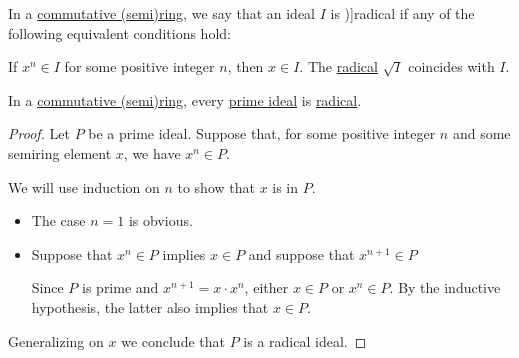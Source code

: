 \begin{definition}\label{def:radical_ideal}\cite[def. VII.2.13]{Aluffi2009}
  In a \hyperref[def:ring/commutative]{commutative (semi)ring}, we say that an ideal \( I \) is \term[ru=радикал (\cite[406]{Винберг2014})]{radical} if any of the following equivalent conditions hold:
  \begin{thmenum}
     If \( x^n \in I \) for some positive integer \( n \), then \( x \in I \).
     The \hyperref[def:radical_of_ideal]{radical} \( \sqrt I \) coincides with \( I \).
  \end{thmenum}
\end{definition}

\begin{proposition}\label{thm:prime_ideal_is_radical}
  In a \hyperref[def:ring/commutative]{commutative (semi)ring}, every \hyperref[def:semiring_ideal/prime]{prime ideal} is \hyperref[def:radical_ideal]{radical}.
\end{proposition}
\begin{proof}
  Let \( P \) be a prime ideal. Suppose that, for some positive integer \( n \) and some semiring element \( x \), we have \( x^n \in P \).

  We will use induction on \( n \) to show that \( x \) is in \( P \).
  \begin{itemize}
    \item The case \( n = 1 \) is obvious.
    \item Suppose that \( x^n \in P \) implies \( x \in P \) and suppose that \( x^{n+1} \in P \)

    Since \( P \) is prime and \( x^{n+1} = x \cdot x^n \), either \( x \in P \) or \( x^n \in P \). By the inductive hypothesis, the latter also implies that \( x \in P \).
  \end{itemize}

  Generalizing on \( x \) we conclude that \( P \) is a radical ideal.
\end{proof}


